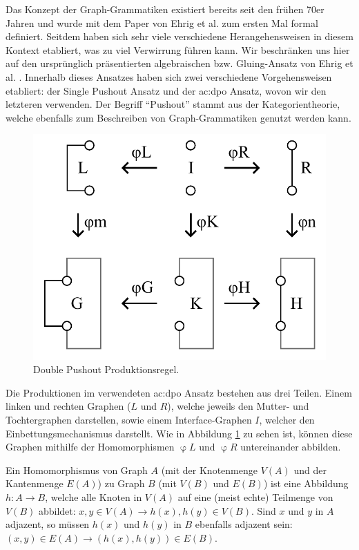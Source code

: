 Das Konzept der Graph-Grammatiken existiert bereits seit den frühen 70er Jahren und wurde mit dem Paper von Ehrig et al. \cite{7_ehrig_et_al}
zum ersten Mal formal definiert. Seitdem haben sich sehr viele verschiedene Herangehensweisen in diesem Kontext etabliert, was zu viel Verwirrung
führen kann. \cite{30_könig_et_al} Wir beschränken uns hier auf den ursprünglich präsentierten algebraischen bzw. Gluing-Ansatz von Ehrig 
et al. \cite{7_ehrig_et_al}. Innerhalb dieses Ansatzes haben sich zwei verschiedene Vorgehensweisen etabliert: der Single Pushout Ansatz und der
\gls{ac:dpo} Ansatz, wovon wir den letzteren verwenden. Der Begriff ``Pushout'' stammt aus der Kategorientheorie, welche ebenfalls zum Beschreiben
von Graph-Grammatiken genutzt werden kann. \cite{1_merrell}

\begin{figure}[t]
    \centering
    \includegraphics[width=\imgWidth/2]{images/dpo_rule.pdf}
    \caption{Double Pushout Produktionsregel.}
    \label{fig:dpo_rule}
\end{figure}

Die Produktionen im verwendeten \gls{ac:dpo} Ansatz bestehen aus drei Teilen. Einem linken und rechten Graphen (\(L\) und \(R\)), welche jeweils
den Mutter- und Tochtergraphen darstellen, sowie einem Interface-Graphen \(I\), welcher den Einbettungsmechanismus darstellt. Wie in Abbildung
\ref{fig:dpo_rule} zu sehen ist, können diese Graphen mithilfe der Homomorphismen \(\upvarphi L\) und \(\upvarphi R\) untereinander abbilden.

Ein Homomorphismus von Graph \(A\) (mit der Knotenmenge \(V(A)\) und der Kantenmenge \(E(A)\)) zu Graph \(B\) (mit \(V(B)\) und \(E(B)\)) ist eine
Abbildung \(h: A \rightarrow B\), welche alle Knoten in \(V(A)\) auf eine (meist echte) Teilmenge von \(V(B)\) abbildet: \(x, y \in V(A)
\rightarrow h(x), h(y) \in V(B)\). Sind \(x\) und \(y\) in \(A\) adjazent, so müssen \(h(x)\) und \(h(y)\) in \(B\) ebenfalls adjazent sein:
\((x, y) \in E(A) \rightarrow (h(x), h(y)) \in E(B)\). \cite{35_sabidussi}

